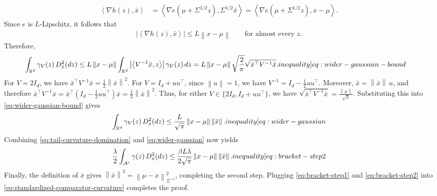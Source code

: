 \documentclass[12pt,cleveref]{jmlr}
\renewenvironment{proof}[1][\proofname]
{\par\noindent{\bfseries\upshape #1\ }}
{\jmlrQED}
\newcommand{\ineqlabel}[1]{\label[inequality]{#1}}
\newcommand{\R}{\mathbb R}
\newcommand{\1}{\mathbf 1}
\newcommand{\ip}[2]{\left\langle #1,#2\right\rangle}
\newcommand{\norm}[1]{\left\lVert #1\right\rVert}
\newcommand{\normm}[2]{\left\lVert #1\right\rVert_{#2}}
\begin{document}
\begin{proof}[Proof of \cref{prop:bracket}]
    \begin{align}
        \ip{\nabla h(z)}{\bar{x}}
        & =
        \ip{\nabla e(\mu+\Sigma^{1/2}z)}
        {\Sigma^{1/2}\bar{x}}
        =
        \ip{\nabla e(\mu+\Sigma^{1/2}z)}
        {x-\mu}.
    \end{align}
    Since $e$ is $L$-Lipschitz, it follows that
    \begin{align}
        \left|\ip{\nabla h(z)}{\bar{x}}\right|
        \leq
        L\norm{x-\mu}
        \qquad\text{for almost every }z.
    \end{align}
    Therefore,
    \begin{align}
        \int_{\R^d}\gamma_V(z)\,D^2_{\bar{x}}(dz)
        & \leq
        L\norm{x-\mu}
        \int_{\R^d}
        \left|\ip{V^{-1}\bar{x}}{z}\right|
        \gamma_V(z)\,dz
        =
        L\norm{x-\mu}
        \sqrt{\frac{2}{\pi}}
        \sqrt{\bar{x}^\top V^{-1}\bar{x}}.
        \ineqlabel{eq:wider-gaussian-bound}
    \end{align}
    For $V=2I_d$, we have
    $\bar{x}^\top V^{-1}\bar{x}=\frac12\norm{\bar{x}}^2$.
    For $V=I_d+uu^\top$, since $\norm u=1$,
    we have
    $V^{-1}
    =
    I_d-\frac12uu^\top$.
    Moreover, $\bar{x}=\norm{\bar{x}}\,u$, and therefore
    $\bar{x}^\top V^{-1}\bar{x}=
    \bar{x}^\top
    \left(I_d-\frac12uu^\top\right)\bar{x}
    =\frac12\norm{\bar{x}}^2$.
    Thus, for either
    $V\in\{2I_d,I_d+uu^\top\}$,
    we have
    $\sqrt{\bar{x}^\top V^{-1}\bar{x}} = \frac{\norm{\bar{x}}}{\sqrt2}$.
    Substituting this into \cref{eq:wider-gaussian-bound} gives
    \begin{align}
        \int_{\R^d}\gamma_V(z)\,D^2_{\bar{x}}(dz)
        \leq
        \frac{L}{\sqrt\pi}
        \norm{x-\mu}\norm{\bar{x}}.
        \ineqlabel{eq:wider-gaussian}
    \end{align}
    Combining \cref{eq:tail-curvature-domination} and
    \cref{eq:wider-gaussian} now yields
    \begin{align}
        \frac{\lambda}{2}\int_{\mathcal A^c}\gamma(z)\,D^2_{\bar{x}}(dz)
        \leq
        \frac{\beta L \lambda}{2\sqrt\pi}
        \norm{x-\mu}\norm{\bar{x}}.
        \ineqlabel{eq:bracket-step2}
    \end{align}
    Finally, the definition of $\bar{x}$ gives
    $\norm{\bar{x}}^2=\normm{\mu-x}{\Sigma^{-1}}^2$,
    completing the second step.
    Plugging \cref{eq:bracket-step1} and \cref{eq:bracket-step2}
    into \cref{eq:standardized-comparator-curvature}
    completes the proof.
\end{proof}
\end{document}
